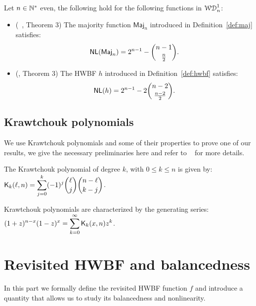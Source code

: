 \documentclass[11pt]{llncs}
\begin{document}
\begin{Prop}
Let $n\in \mathbb{N}^*$ even, the following hold for the following functions in $\mathcal{WD}^{1}_{n}$: 
\begin{itemize}
	\item (\eg ~\cite{DCC:DalMaiSar06}, Theorem $3$) The majority function $\textsf{Maj}_n$ introduced in Definition~\ref{def:maj} satisfies:
	\[
	\mathsf{NL}(\textsf{Maj}_n)=2^{n-1}-\binom{n-1}{\frac n2}.
	\]
	\item (\cite{DAM:WCST14}, Theorem $3$) The HWBF $h$ introduced in Definition~\ref{def:hwbf} satisfies:
	\[
	\mathsf{NL}(h)=2^{n-1}-2\binom{n-2}{\frac{n-2}{2}}.
	\]	
\end{itemize}
\end{Prop}






\subsection{Krawtchouk polynomials}
We use Krawtchouk polynomials and some of their properties to prove one of our results, we give the necessary preliminaries here and refer to \eg ~\cite{book:MacSlo78} for more details.

\begin{definition}\label{def:Kraw}
	The Krawtchouk polynomial of degree $k$, with $0\leq k\leq n$ is given by: $ \displaystyle \mathsf{K}_{k}(\ell,n)=\sum_{j=0}^{k} (-1)^j \binom{\ell}{j} \binom{n-\ell}{k-j}$. 
	
	Krawtchouk polynomials are characterized by the generating series: $ \displaystyle (1+z)^{n-x} (1-z)^x=\sum_{k=0}^\infty \mathsf{K}_{k}(x,n) z^k$.
\end{definition}






\section{Revisited HWBF and balancedness}

In this part we formally define the revisited HWBF function $f$ and introduce a quantity that allows us to study its balancedness and nonlinearity.
\end{document}
